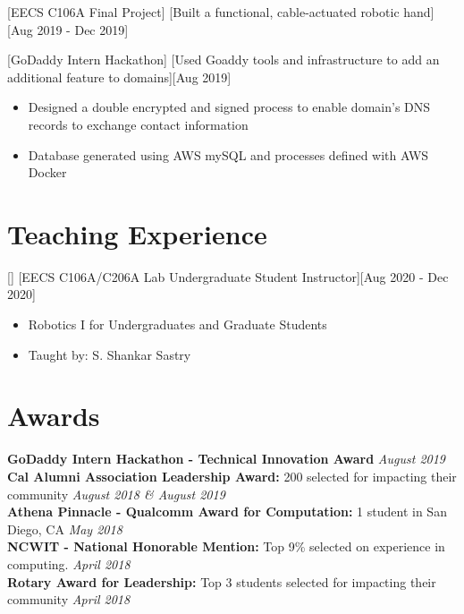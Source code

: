 \documentclass{article}
\begin{document}
 [EECS C106A Final Project]
[Built a functional, cable-actuated robotic hand][Aug 2019 - Dec 2019]

 [GoDaddy Intern Hackathon]
[Used Goaddy tools and infrastructure to add an additional feature to domains][Aug 2019]
\begin{itemize}
\item Designed a double encrypted and signed process to enable domain’s DNS records to exchange contact information
\item Database generated using AWS mySQL and processes defined with AWS Docker
\end{itemize}

\section{Teaching Experience}
 []
[EECS C106A/C206A Lab Undergraduate Student Instructor][Aug 2020 - Dec 2020]
\begin{itemize}
\item Robotics I for Undergraduates and Graduate Students
\item Taught by: S. Shankar Sastry
\end{itemize}

\section{Awards}
\textbf{GoDaddy Intern Hackathon - Technical Innovation Award} \hfill \textit{August 2019}\\
\textbf{Cal Alumni Association Leadership Award:} 200 selected for impacting their community \hfill \textit{August 2018 \& August 2019}\\
\textbf{Athena Pinnacle - Qualcomm Award for Computation:} 1 student in San Diego, CA \hfill \textit{May 2018} \\
\textbf{NCWIT - National Honorable Mention:} Top 9\% selected on experience in computing. \hfill \textit{April 2018} \\
\textbf{Rotary Award for Leadership:} Top 3 students selected for impacting their community \hfill \textit{April 2018} 
\end{document}
